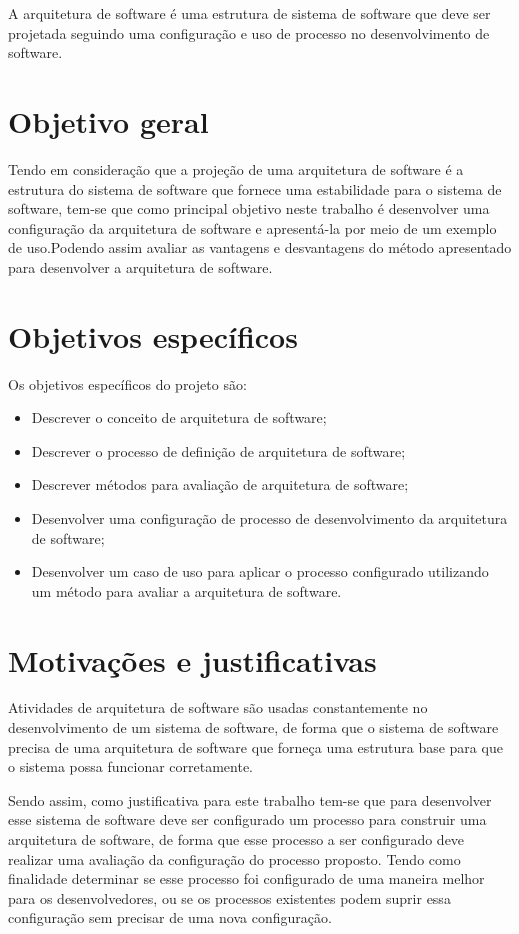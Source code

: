 A arquitetura de software é uma estrutura de sistema de software que deve ser projetada seguindo uma configuração e uso de processo no desenvolvimento de software.

\section{Objetivo geral}

Tendo em consideração que a projeção de uma arquitetura de software é a estrutura do sistema de software  que fornece uma estabilidade para o sistema de software, tem-se que como principal objetivo neste trabalho é desenvolver uma configuração da arquitetura de software e apresentá-la por meio de um exemplo de uso.Podendo assim avaliar as vantagens e desvantagens 
do método apresentado para desenvolver a arquitetura de software.

\section{Objetivos específicos}

Os objetivos específicos do projeto são:
\begin{itemize}
    \item Descrever o conceito de arquitetura de software;
    \item Descrever o processo de definição de arquitetura de software;
    \item Descrever métodos para avaliação de arquitetura de software;
    \item Desenvolver uma configuração de processo de desenvolvimento da arquitetura de software;
    \item Desenvolver um caso de uso para aplicar o processo configurado utilizando um método para avaliar a arquitetura de software.
    
\end{itemize}

\section{Motivações e justificativas}

Atividades de arquitetura de software são usadas constantemente no desenvolvimento de um sistema de software, de forma que o sistema de software precisa de uma arquitetura de software que forneça uma estrutura base para que o sistema possa funcionar corretamente.


Sendo assim, como justificativa para este trabalho tem-se que para desenvolver esse sistema de software deve ser configurado um processo para construir uma arquitetura de software, de forma que esse processo a ser configurado deve realizar uma avaliação da configuração do processo proposto. Tendo como finalidade determinar se esse processo foi configurado de uma maneira melhor para os desenvolvedores, ou se os processos existentes podem suprir essa configuração sem precisar de uma nova configuração.

